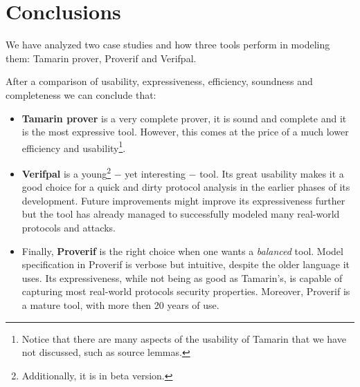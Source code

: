 
\section{Conclusions}
\label{section:conclusions}

We have analyzed two case studies and how three tools perform in modeling them: Tamarin prover, Proverif and Verifpal.

After a comparison of usability, expressiveness, efficiency, soundness and completeness we can conclude that:
\begin{itemize}
    \item{\textbf{Tamarin prover} is a very complete prover, it is sound and complete and it is the most expressive tool. However, this comes at the price of a much lower efficiency and usability\footnote{Notice that there are many aspects of the usability of Tamarin that we have not discussed, such as source lemmas.}.}
    \item{\textbf{Verifpal} is a young\footnote{Additionally, it is in beta version.} $-$ yet interesting $-$ tool. Its great usability makes it a good choice for a quick and dirty protocol analysis in the earlier phases of its development. Future improvements might improve its expressiveness further but the tool has already managed to successfully modeled many real-world protocols and attacks.}
    \item{Finally, \textbf{Proverif} is the right choice when one wants a \textit{balanced} tool. Model specification in Proverif is verbose but intuitive, despite the older language it uses. Its expressiveness, while not being as good as Tamarin's, is capable of capturing most real-world protocols security properties. Moreover, Proverif is a mature tool, with more then 20 years of use.}
\end{itemize}